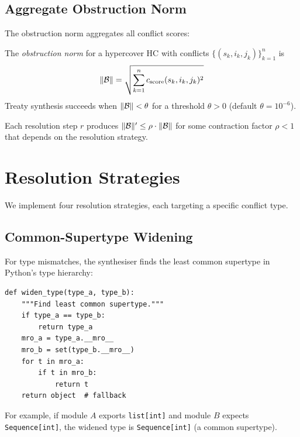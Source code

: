\documentclass[11pt]{article}
\newcommand{\cscore}[1][]{c_{\mathrm{score}#1}}
\newcommand{\cthresh}{\theta}
\newcommand{\HC}{\mathrm{HC}}
\newcommand{\onorm}{\|\obstr\|}
\begin{document}
\subsection{Aggregate Obstruction Norm}

The obstruction norm aggregates all conflict scores:

\begin{definition}\label{def:onorm}
The \emph{obstruction norm} for a hypercover $\HC$ with conflicts
$\{(s_k, i_k, j_k)\}_{k=1}^n$ is
\[
  \onorm = \sqrt{\sum_{k=1}^n \cscore(s_k, i_k, j_k)^2}
\]
Treaty synthesis succeeds when $\onorm < \cthresh$ for a threshold
$\cthresh > 0$ (default $\cthresh = 10^{-6}$).
\end{definition}

\begin{lemma}\label{lem:norm-mono}
Each resolution step $r$ produces $\onorm' \leq \rho \cdot \onorm$
for some contraction factor $\rho < 1$ that depends on the
resolution strategy.
\end{lemma}

\section{Resolution Strategies}\label{sec:strategies}

We implement four resolution strategies, each targeting a specific
conflict type.

\subsection{Common-Supertype Widening}

For type mismatches, the synthesiser finds the least common supertype
in Python's type hierarchy:

\begin{lstlisting}[style=jugeo-python,caption={Common-supertype widening.}]
def widen_type(type_a, type_b):
    """Find least common supertype."""
    if type_a == type_b:
        return type_a
    mro_a = type_a.__mro__
    mro_b = set(type_b.__mro__)
    for t in mro_a:
        if t in mro_b:
            return t
    return object  # fallback
\end{lstlisting}

For example, if module $A$ exports \texttt{list[int]} and module $B$
expects \texttt{Sequence[int]}, the widened type is
\texttt{Sequence[int]} (a common supertype).
\end{document}

